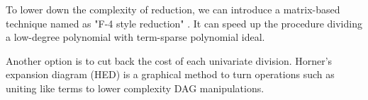 To lower down the complexity of reduction, we can introduce a matrix-based technique named as "F-4 style reduction" \cite{F4reduce}. 
It can speed up the procedure dividing a low-degree polynomial with term-sparse polynomial ideal. 

Another option is to cut back the cost of each univariate division. Horner's expansion diagram (HED)\cite{alizadeh2010modular}
is a graphical method to turn operations such as uniting like terms to lower complexity DAG manipulations.